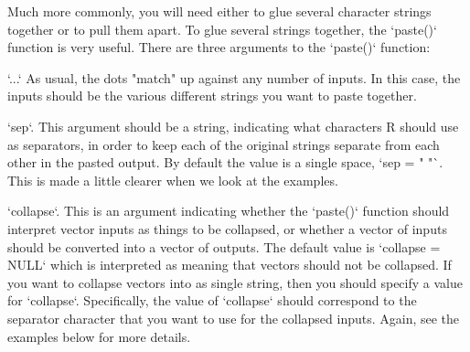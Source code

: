 Much more commonly, you will need either to glue several character strings together or to pull them apart. To glue several strings together, the `paste()` function is very useful. There are three arguments to the `paste()` function:
 \itemsep 0pt
\item `...`  As usual, the dots "match" up against any number of inputs. In this case, the inputs should be the various different strings you want to paste together.
\item `sep`. This argument should be a string, indicating what characters R should use as separators, in order to keep each of the original strings separate from each other in the pasted output. By default the value is a single space, `sep = " "`. This is made a little clearer when we look at the examples. 
\item `collapse`. This is an argument indicating whether the `paste()` function should interpret vector inputs as things to be collapsed, or whether a vector of inputs should be converted into a vector of outputs. The default value is `collapse = NULL` which is interpreted as meaning that vectors should not be collapsed. If you want to collapse vectors into as single string, then you should specify a value for `collapse`. Specifically, the value of `collapse` should correspond to the separator character that you want to use for the collapsed inputs. Again, see the examples below for more details. 

